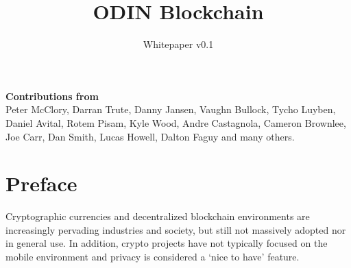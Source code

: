 \documentclass[12pt,letterpaper]{article}
\begin{document}

\title{\Huge ODIN Blockchain}
\author{Whitepaper v0.1}
\maketitle
\fancyfoot{}
\thispagestyle{fancy}
\renewcommand{\headrulewidth}{0pt}
\newpage

\newcommand{\MyPrefaceTitle}{%
\begin{center}
\Large 
\textbf{Contributions from}
\normalsize 
\vspace{1cm}
\\
Peter McClory, Darran Trute, Danny Jansen, Vaughn Bullock, Tycho Luyben, Daniel Avital, Rotem Pisam, Kyle Wood, Andre Castagnola, Cameron Brownlee, Joe Carr, Dan Smith, Lucas Howell, Dalton Faguy and many others.
\end{center}
}
\mbox{}
\MyPrefaceTitle  

\newpage 
{}                                   
\tableofcontents

\newpage
\pagestyle{fancy}
\lhead{}
\rhead{}
\cfoot{}
\renewcommand{\headrulewidth}{0pt}
\rfoot[R]{\thepage}

\section{Preface}
Cryptographic currencies and decentralized blockchain environments are increasingly pervading industries and society, but still not massively adopted nor in general use. In addition, crypto projects have not typically focused on the mobile environment and privacy is considered a `nice to have' feature.
\end{document}

